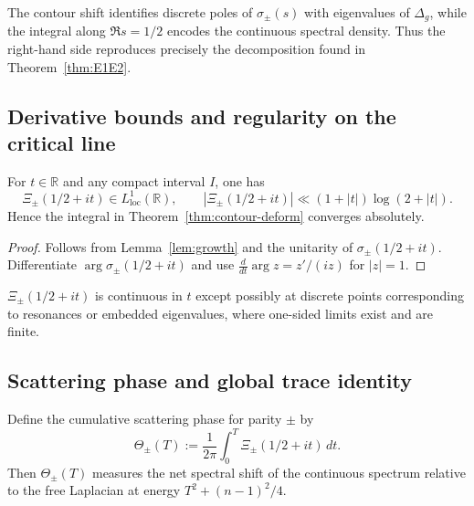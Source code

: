 \begin{remark}
\label{rem:geom-interp}
The contour shift identifies discrete poles of $\sigma_\pm(s)$ with eigenvalues of $\Delta_g$, while the integral along $\Re s=1/2$ encodes the continuous spectral density.  
Thus the right-hand side reproduces precisely the decomposition found in Theorem~\ref{thm:E1E2}. %
\end{remark}

\subsection{Derivative bounds and regularity on the critical line}
\label{subsec:ch6-part4-critical-line} \relax

\begin{lemma}
\label{lem:Xi-bounds}
For $t\in\mathbb{R}$ and any compact interval $I$, one has
\[
\Xi_\pm(1/2+it)\in L^1_{\mathrm{loc}}(\mathbb{R}),\qquad
|\Xi_\pm(1/2+it)|\ll (1+|t|)\log(2+|t|).
\]
Hence the integral in Theorem~\ref{thm:contour-deform} converges absolutely. %
\end{lemma}

\begin{proof}
Follows from Lemma~\ref{lem:growth} and the unitarity of $\sigma_\pm(1/2+it)$.  
Differentiate $\arg\sigma_\pm(1/2+it)$ and use $\frac{d}{dt}\arg z=z'/(iz)$ for $|z|=1$. %
\end{proof}

\begin{remark}
\label{rem:smoothness}
$\Xi_\pm(1/2+it)$ is continuous in $t$ except possibly at discrete points corresponding to resonances or embedded eigenvalues, where one-sided limits exist and are finite. %
\end{remark}

\subsection{Scattering phase and global trace identity}
\label{subsec:ch6-part4-trace-identity} \relax

\begin{definition}
\label{def:scattering-phase}
Define the cumulative scattering phase for parity $\pm$ by
\[
\Theta_\pm(T):=\frac{1}{2\pi}\int_0^T \Xi_\pm(1/2+it)\,dt.
\]
Then $\Theta_\pm(T)$ measures the net spectral shift of the continuous spectrum relative to the free Laplacian at energy $T^2+(n-1)^2/4$. %
\end{definition}

